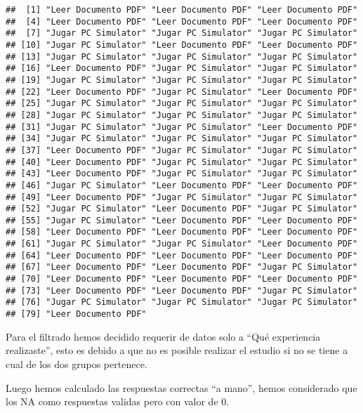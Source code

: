 \documentclass[
]{article}
\begin{document}
\begin{verbatim}
##  [1] "Leer Documento PDF" "Leer Documento PDF" "Leer Documento PDF"
##  [4] "Leer Documento PDF" "Leer Documento PDF" "Leer Documento PDF"
##  [7] "Jugar PC Simulator" "Jugar PC Simulator" "Jugar PC Simulator"
## [10] "Jugar PC Simulator" "Leer Documento PDF" "Leer Documento PDF"
## [13] "Jugar PC Simulator" "Jugar PC Simulator" "Jugar PC Simulator"
## [16] "Leer Documento PDF" "Jugar PC Simulator" "Jugar PC Simulator"
## [19] "Jugar PC Simulator" "Jugar PC Simulator" "Jugar PC Simulator"
## [22] "Leer Documento PDF" "Jugar PC Simulator" "Leer Documento PDF"
## [25] "Jugar PC Simulator" "Jugar PC Simulator" "Jugar PC Simulator"
## [28] "Jugar PC Simulator" "Jugar PC Simulator" "Jugar PC Simulator"
## [31] "Jugar PC Simulator" "Jugar PC Simulator" "Leer Documento PDF"
## [34] "Jugar PC Simulator" "Jugar PC Simulator" "Jugar PC Simulator"
## [37] "Leer Documento PDF" "Jugar PC Simulator" "Jugar PC Simulator"
## [40] "Leer Documento PDF" "Jugar PC Simulator" "Jugar PC Simulator"
## [43] "Leer Documento PDF" "Jugar PC Simulator" "Jugar PC Simulator"
## [46] "Jugar PC Simulator" "Leer Documento PDF" "Leer Documento PDF"
## [49] "Leer Documento PDF" "Jugar PC Simulator" "Jugar PC Simulator"
## [52] "Jugar PC Simulator" "Leer Documento PDF" "Jugar PC Simulator"
## [55] "Jugar PC Simulator" "Leer Documento PDF" "Leer Documento PDF"
## [58] "Leer Documento PDF" "Leer Documento PDF" "Leer Documento PDF"
## [61] "Jugar PC Simulator" "Jugar PC Simulator" "Leer Documento PDF"
## [64] "Leer Documento PDF" "Leer Documento PDF" "Leer Documento PDF"
## [67] "Leer Documento PDF" "Leer Documento PDF" "Jugar PC Simulator"
## [70] "Leer Documento PDF" "Leer Documento PDF" "Leer Documento PDF"
## [73] "Leer Documento PDF" "Leer Documento PDF" "Jugar PC Simulator"
## [76] "Jugar PC Simulator" "Jugar PC Simulator" "Jugar PC Simulator"
## [79] "Leer Documento PDF"
\end{verbatim}

Para el filtrado hemos decidido requerir de datos solo a ``Qué
experiencia realizaste'', esto es debido a que no es posible realizar el
estudio si no se tiene a cual de los dos grupos pertenece.

Luego hemos calculado las respuestas correctas ``a mano'', hemos
considerado que los NA como respuestas validas pero con valor de 0.
\end{document}
